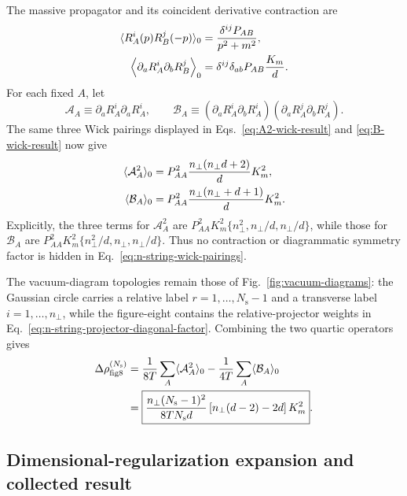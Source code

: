 The massive propagator and its coincident derivative contraction are
\begin{align}
  \langle R_A^i(p)R_B^j(-p)\rangle_0
  &=\frac{\delta^{ij}P_{AB}}{p^2+m^2},
  \notag\\
  \left\langle\partial_aR_A^i\partial_bR_B^j\right\rangle_0
  &=\delta^{ij}\delta_{ab}P_{AB}\frac{K_m}{d}.
  \label{eq:n-string-relative-derivative-propagator}
\end{align}
For each fixed $A$, let
\begin{equation}
  \mathcal A_A\equiv\partial_aR_A^i\partial_aR_A^i,
  \qquad
  \mathcal B_A\equiv
  (\partial_aR_A^i\partial_bR_A^i)
  (\partial_aR_A^j\partial_bR_A^j).
\end{equation}
The same three Wick pairings displayed in
Eqs.~\eqref{eq:A2-wick-result} and \eqref{eq:B-wick-result} now give
\begin{align}
  \langle\mathcal A_A^2\rangle_0
  &=P_{AA}^2\frac{n_\perp(n_\perp d+2)}{d}K_m^2,
  \notag\\
  \langle\mathcal B_A\rangle_0
  &=P_{AA}^2\frac{n_\perp(n_\perp+d+1)}{d}K_m^2.
  \label{eq:n-string-wick-pairings}
\end{align}
Explicitly, the three terms for $\mathcal A_A^2$ are
$P_{AA}^2K_m^2\{n_\perp^2,n_\perp/d,n_\perp/d\}$, while those for
$\mathcal B_A$ are
$P_{AA}^2K_m^2\{n_\perp^2/d,n_\perp,n_\perp/d\}$.  Thus no contraction or
diagrammatic symmetry factor is hidden in Eq.~\eqref{eq:n-string-wick-pairings}.

The vacuum-diagram topologies remain those of
Fig.~\ref{fig:vacuum-diagrams}: the Gaussian circle carries a relative label
$r=1,\ldots,N_{\mathrm s}-1$ and a transverse label
$i=1,\ldots,n_\perp$, while the figure-eight contains the relative-projector
weights in Eq.~\eqref{eq:n-string-projector-diagonal-factor}.  Combining the
two quartic operators gives
\begin{align}
  \Delta\rho_{\mathrm{fig8}}^{(N_{\mathrm s})}
  &=\frac{1}{8T}\sum_A\langle\mathcal A_A^2\rangle_0
    -\frac{1}{4T}\sum_A\langle\mathcal B_A\rangle_0
  \notag\\
  &=\boxed{
    \frac{n_\perp(N_{\mathrm s}-1)^2}{8TN_{\mathrm s}d}
    \left[n_\perp(d-2)-2d\right]K_m^2 }.
  \label{eq:n-string-figure-eight-general-d}
\end{align}

\subsection{Dimensional-regularization expansion and collected result}

